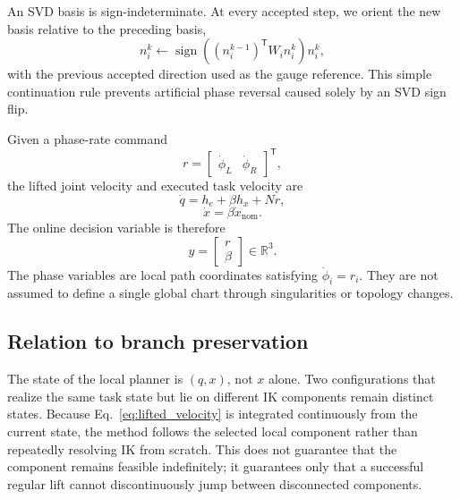 \documentclass[preprint,12pt]{elsarticle}
\newcommand{\R}{\mathbb{R}}
\newcommand{\T}{^{\mathsf T}}
\begin{document}
An SVD basis is sign-indeterminate. At every accepted step, we orient the new basis relative to the preceding basis,
\begin{equation}
 n_i^{k}\leftarrow
 \operatorname{sign}\!\left((n_i^{k-1})\T W_i n_i^{k}\right)n_i^{k},
\label{eq:null_orientation}
\end{equation}
with the previous accepted direction used as the gauge reference. This simple continuation rule prevents artificial phase reversal caused solely by an SVD sign flip.

Given a phase-rate command
\begin{equation}
r=\begin{bmatrix}\dot\phi_L&\dot\phi_R\end{bmatrix}\T,
\end{equation}
the lifted joint velocity and executed task velocity are
\begin{equation}
\boxed{\dot q=h_e+\beta h_x+Nr,}
\label{eq:lifted_velocity}
\end{equation}
\begin{equation}
\boxed{\dot x=\beta\dot x_{\mathrm{nom}}.}
\label{eq:executed_task_rate}
\end{equation}
The online decision variable is therefore
\begin{equation}
y=\begin{bmatrix}r\\\beta\end{bmatrix}\in\R^3.
\label{eq:lift_decision}
\end{equation}
The phase variables are local path coordinates satisfying $\dot\phi_i=r_i$. They are not assumed to define a single global chart through singularities or topology changes.

\subsection{Relation to branch preservation}

The state of the local planner is $(q,x)$, not $x$ alone. Two configurations that realize the same task state but lie on different IK components remain distinct states. Because Eq.~\eqref{eq:lifted_velocity} is integrated continuously from the current state, the method follows the selected local component rather than repeatedly resolving IK from scratch. This does not guarantee that the component remains feasible indefinitely; it guarantees only that a successful regular lift cannot discontinuously jump between disconnected components.
\end{document}
